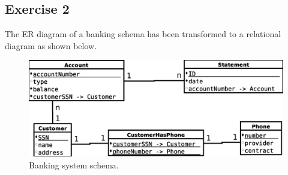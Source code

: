 \subsection{Exercise 2}
The ER diagram of a banking schema has been transformed to a relational diagram as shown below.

\begin{figure}[H]
  \centering
  \includegraphics[width=\linewidth]{3-12.03.14/exercise2.eps}
  \caption{Banking system schema.}\label{fig:ex2schema}
\end{figure}
